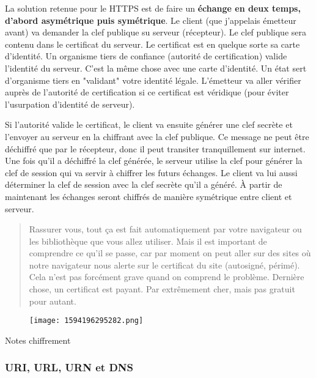 \documentclass[a4paper]{article}
\begin{document}
La solution retenue pour le HTTPS est de faire un \textbf{échange en
deux temps, d'abord asymétrique puis symétrique}. Le client (que
j'appelais émetteur avant) va demander la clef publique su serveur
(récepteur). Le clef publique sera contenu dans le certificat du
serveur. Le certificat est en quelque sorte sa carte d'identité. Un
organisme tiers de confiance (autorité de certification) valide
l'identité du serveur. C'est la même chose avec une carte d'identité. Un
état sert d'organisme tiers en "validant" votre identité légale.
L'émetteur va aller vérifier auprès de l'autorité de certification si ce
certificat est véridique (pour éviter l'usurpation d'identité de
serveur).

Si l'autorité valide le certificat, le client va ensuite générer une
clef secrète et l'envoyer au serveur en la chiffrant avec la clef
publique. Ce message ne peut être déchiffré que par le récepteur, donc
il peut transiter tranquillement sur internet. Une fois qu'il a
déchiffré la clef générée, le serveur utilise la clef pour générer la
clef de session qui va servir à chiffrer les futurs échanges. Le client
va lui aussi déterminer la clef de session avec la clef secrète qu'il a
généré. À partir de maintenant les échanges seront chiffrés de manière
symétrique entre client et serveur.

\begin{quote}
Rassurer vous, tout ça est fait automatiquement par votre navigateur ou
les bibliothèque que vous allez utiliser. Mais il est important de
comprendre ce qu'il se passe, car par moment on peut aller sur des sites
où notre navigateur nous alerte sur le certificat du site (autosigné,
périmé). Cela n'est pas forcément grave quand on comprend le problème.
Dernière chose, un certificat est payant. Par extrêmement cher, mais pas
gratuit pour autant.
\end{quote}

\begin{figure}
\hypertarget{mermaid}{%
\centering
\texttt{[image: 1594196295282.png]}
\caption{}\label{mermaid}
}
\end{figure}

            Notes chiffrement

\hypertarget{header-n47}{%
\subsubsection{URI, URL, URN et DNS}\label{header-n47}}
\end{document}
